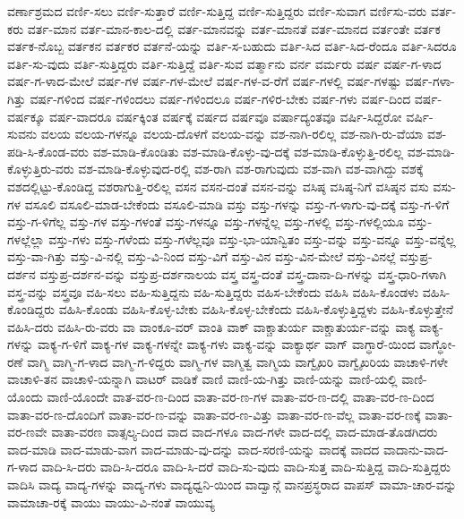 {ವರ್ಣಾಶ್ರಮದ
ವರ್ಣಿ-ಸಲು
ವರ್ಣಿ-ಸುತ್ತಾರೆ
ವರ್ಣಿ-ಸುತ್ತಿದ್ದ
ವರ್ಣಿ-ಸುತ್ತಿದ್ದರು
ವರ್ಣಿ-ಸುವಾಗ
ವರ್ಣಿಸು-ವರು
ವರ್ತ-ಕರು
ವರ್ತ-ಮಾನ
ವರ್ತ-ಮಾನ-ಕಾಲ-ದಲ್ಲಿ
ವರ್ತ-ಮಾನವನ್ನು
ವರ್ತ-ಮಾನತೆ
ವರ್ತ-ಮಾನದ
ವರ್ತಂತೇ
ವರ್ತಕ
ವರ್ತಕ-ನೊಬ್ಬ
ವರ್ತಕನ
ವರ್ತಕರ
ವರ್ತನೆ-ಯನ್ನು
ವರ್ತಿ-ಸ-ಬಹುದು
ವರ್ತಿ-ಸಿದ
ವರ್ತಿ-ಸಿದ-ರೆಂದೂ
ವರ್ತಿ-ಸಿದರೂ
ವರ್ತಿ-ಸು-ವುದು
ವರ್ತಿ-ಸುತ್ತಿದ್ದರು
ವರ್ತಿ-ಸುತ್ತಿದ್ದೆ
ವರ್ತಿ-ಸುವ
ವರ್ತ್ಮಾನು
ವರ್ನ
ವರ್ಮರು
ವರ್ಷ
ವರ್ಷ-ಗ-ಳಾದ
ವರ್ಷ-ಗ-ಳಾದ-ಮೇಲೆ
ವರ್ಷ-ಗಳ
ವರ್ಷ-ಗಳ-ಮೇಲೆ
ವರ್ಷ-ಗಳ-ವ-ರೆಗೆ
ವರ್ಷ-ಗಳಲ್ಲಿ
ವರ್ಷ-ಗಳಷ್ಟು
ವರ್ಷ-ಗಳಾ-ಗಿತ್ತು
ವರ್ಷ-ಗಳಿಂದ
ವರ್ಷ-ಗಳಿಂದಲು
ವರ್ಷ-ಗಳಿಂದಲೂ
ವರ್ಷ-ಗಳಿರ-ಬೇಕು
ವರ್ಷ-ಗಳು
ವರ್ಷ-ದಿಂದ
ವರ್ಷ-ವರ್ಷಕ್ಕೂ
ವರ್ಷ-ವಾದರೂ
ವರ್ಷಕ್ಕಿಂತ
ವರ್ಷಕ್ಕೆ
ವರ್ಷದ
ವರ್ಷವೂ
ವರ್ಷಾದ್ಯಂತವೂ
ವರ್ಷಿ-ಸಿದ್ದರೋ
ವರ್ಷಿ-ಸುವನು
ವಲಯ
ವಲಯ-ಗಳನ್ನೂ
ವಲಯ-ದೊಳಗೆ
ವಲಯ-ವನ್ನು
ವಶ-ನಾಗಿ-ರಲಿಲ್ಲ
ವಶ-ನಾಗಿ-ರು-ವೆಯಾ
ವಶ-ಪಡಿ-ಸಿ-ಕೊಂಡ-ವರು
ವಶ-ಮಾಡಿ-ಕೊಂಡಿತು
ವಶ-ಮಾಡಿ-ಕೊಳ್ಳು-ವು-ದಕ್ಕೆ
ವಶ-ಮಾಡಿ-ಕೊಳ್ಳುತ್ತಿ-ರಲಿಲ್ಲ
ವಶ-ಮಾಡಿ-ಕೊಳ್ಳುತ್ತಿರು-ವರು
ವಶ-ಮಾಡಿ-ಕೊಳ್ಳುವುದ-ರಲ್ಲಿ
ವಶ-ರಾಗಿ
ವಶ-ರಾಗುವುದು
ವಶ-ವಾಗಿ
ವಶ-ವಾಗಿದ್ದು
ವಶಕ್ಕೆ
ವಶದಲ್ಲಿಟ್ಟು-ಕೊಂಡಿದ್ದ
ವಶರಾಗುತ್ತಿ-ರಲಿಲ್ಲ
ವಸನ
ವಸನ-ದಂತೆ
ವಸನ-ವನ್ನು
ವಸಿಷ್ಠ
ವಸಿಷ್ಠ-ನಿಗೆ
ವಸಿಷ್ಠನ
ವಸು
ವಸು-ಗಳ
ವಸೂಲಿ
ವಸೂಲಿ-ಮಾಡ-ಬೇಕೆಂದು
ವಸೂಲಿ-ಮಾಡಿ
ವಸ್ತು
ವಸ್ತು-ಗಳನ್ನು
ವಸ್ತು-ಗ-ಳಾಗು-ವು-ದಕ್ಕೆ
ವಸ್ತು-ಗ-ಳಿಗೆ
ವಸ್ತು-ಗ-ಳಿಗೆಲ್ಲ
ವಸ್ತು-ಗಳ
ವಸ್ತು-ಗಳಂತೆ
ವಸ್ತು-ಗಳನ್ನೂ
ವಸ್ತು-ಗಳನ್ನೆಲ್ಲ
ವಸ್ತು-ಗಳಲ್ಲಿ
ವಸ್ತು-ಗಳಲ್ಲಿಯೂ
ವಸ್ತು-ಗಳಲ್ಲೆಲ್ಲಾ
ವಸ್ತು-ಗಳು
ವಸ್ತು-ಗಳೆಂದು
ವಸ್ತು-ಗಳೆಲ್ಲವೂ
ವಸ್ತು-ಭಾ-ಯಾನ್ವಿತಂ
ವಸ್ತು-ವನ್ನು
ವಸ್ತು-ವನ್ನೂ
ವಸ್ತು-ವನ್ನೆಲ್ಲ
ವಸ್ತು-ವಾ-ಗಿತ್ತು
ವಸ್ತು-ವಿ-ನಲ್ಲಿ
ವಸ್ತು-ವಿ-ನಿಂದ
ವಸ್ತು-ವಿಗೆ
ವಸ್ತು-ವಿನ
ವಸ್ತು-ವಿನ-ಮೇಲೆ
ವಸ್ತು-ವಿನಲ್ಲೆ
ವಸ್ತುಪ್ರ-ದರ್ಶನ
ವಸ್ತುಪ್ರ-ದರ್ಶನ-ವನ್ನು
ವಸ್ತುಪ್ರ-ದರ್ಶನಾಲಯ
ವಸ್ತ್ರ
ವಸ್ತ್ರ-ದಂತೆ
ವಸ್ತ್ರ-ದಾನಾ-ದಿ-ಗಳನ್ನು
ವಸ್ತ್ರ-ಧಾರಿ-ಗಳಾಗಿ
ವಸ್ತ್ರ-ವನ್ನು
ವಸ್ತ್ರವೂ
ವಹಿ-ಸಲು
ವಹಿ-ಸುತ್ತಿದ್ದನು
ವಹಿ-ಸುತ್ತಿದ್ದರು
ವಹಿಸ-ಬೇಕೆಂದು
ವಹಿಸಿ
ವಹಿಸಿ-ಕೊಂಡಳು
ವಹಿಸಿ-ಕೊಂಡಿದ್ದರು
ವಹಿಸಿ-ಕೊಂಡು
ವಹಿಸಿ-ಕೊಳ್ಳ-ಬೇಕು
ವಹಿಸಿ-ಕೊಳ್ಳ-ಬೇಕೆಂದು
ವಹಿಸಿ-ಕೊಳ್ಳುತ್ತಿದ್ದಳು
ವಹಿಸಿ-ಕೊಳ್ಳುತ್ತೇನೆ
ವಹಿಸಿ-ದರು
ವಹಿಸಿ-ರು-ವರು
ವಾ
ವಾಂಕೂ-ವರ್
ವಾಂತಿ
ವಾಕ್
ವಾಕ್ಚಾತುರ್ಯ
ವಾಕ್ಚಾತುರ್ಯ-ವನ್ನು
ವಾಕ್ಯ
ವಾಕ್ಯ-ಗಳನ್ನು
ವಾಕ್ಯ-ಗ-ಳಿಗೆ
ವಾಕ್ಯ-ಗಳ
ವಾಕ್ಯ-ಗಳನ್ನೇ
ವಾಕ್ಯ-ಗಳು
ವಾಕ್ಯ-ವನ್ನು
ವಾಕ್ಯಾರ್ಥ
ವಾಗ್
ವಾಗ್ಧಾರೆ-ಯಿಂದ
ವಾಗ್ಧೋ-ರಣೆ
ವಾಗ್ಮಿ
ವಾಗ್ಮಿ-ಗ-ಳಾದ
ವಾಗ್ಮಿ-ಗ-ಳಿದ್ದರು
ವಾಗ್ಮಿ-ಗಳ
ವಾಗ್ಮಿತ್ವ
ವಾಗ್ಮಿಯ
ವಾಗ್ವೈಖರಿ
ವಾಗ್ವೈಖರಿಯ
ವಾಚಾಳಿ-ಗಳೇ
ವಾಚಾಳಿ-ತನ
ವಾಚಾಳಿ-ಯನ್ನಾಗಿ
ವಾಟರ್
ವಾಡಿಕೆ
ವಾಣಿ
ವಾಣಿ-ಯ-ಗಿತ್ತು
ವಾಣಿ-ಯನ್ನು
ವಾಣಿ-ಯಲ್ಲಿ
ವಾಣಿ-ಯೊಂದು
ವಾಣಿ-ಯೊಂದೇ
ವಾತ-ವರ-ಣ-ದಿಂದ
ವಾತಾ-ವರ-ಣ-ಗಳ
ವಾತಾ-ವರ-ಣ-ದಲ್ಲಿ
ವಾತಾ-ವರ-ಣ-ದಿಂದ
ವಾತಾ-ವರ-ಣ-ದೊಂದಿಗೆ
ವಾತಾ-ವರ-ಣ-ವನ್ನು
ವಾತಾ-ವರ-ಣ-ವಿತ್ತು
ವಾತಾ-ವರ-ಣ-ವೆಲ್ಲ
ವಾತಾ-ವರ-ಣಕ್ಕೆ
ವಾತಾ-ವರ-ಣವೇ
ವಾತಾ-ವರಣ
ವಾತ್ಸಲ್ಯ-ದಿಂದ
ವಾದ
ವಾದ-ಗಳೂ
ವಾದ-ಗಳೇ
ವಾದ-ದಲ್ಲಿ
ವಾದ-ಮಾಡ-ತೊಡಗಿದರು
ವಾದ-ಮಾಡಿ
ವಾದ-ಮಾಡು-ವಾಗ
ವಾದ-ಮಾಡು-ವು-ದನ್ನು
ವಾದ-ಸರಣಿ-ಯನ್ನು
ವಾದಕ್ಕೆ
ವಾದದ
ವಾದಾನು-ವಾದ-ಗ-ಳಾದ
ವಾದಿ-ಸಿ-ದರು
ವಾದಿ-ಸಿ-ದರೂ
ವಾದಿ-ಸಿ-ದರೆ
ವಾದಿ-ಸು-ವುದು
ವಾದಿ-ಸುತ್ತ
ವಾದಿ-ಸುತ್ತಿದ್ದ
ವಾದಿ-ಸುತ್ತಿದ್ದರು
ವಾದಿಸಿ
ವಾದ್ಯ
ವಾದ್ಯ-ಗಳನ್ನು
ವಾದ್ಯ-ಗಳು
ವಾದ್ಯಧ್ವನಿ-ಯಿಂದ
ವಾದ್ವಾನ್ಗೆ
ವಾನಪ್ರಸ್ಥರಾದ
ವಾಪಸ್
ವಾಮಾ-ಚಾರ-ವನ್ನು
ವಾಮಾಚಾ-ರಕ್ಕೆ
ವಾಯು
ವಾಯು-ವಿ-ನಂತೆ
ವಾಯುವ್ಯ
}
